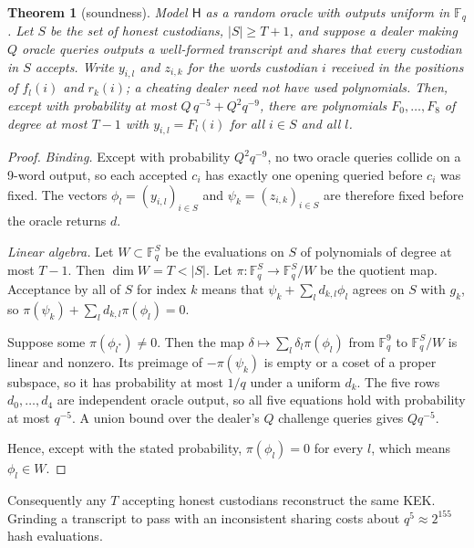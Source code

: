 \documentclass[10pt,a4paper]{article}
\newcommand{\Fq}{\mathbb{F}_q}
\newcommand{\Hash}{\mathsf{H}}
\newcommand{\abs}[1]{\left\lvert #1 \right\rvert}
\newtheorem{theorem}{Theorem}
\theoremstyle{definition}
\theoremstyle{remark}
\begin{document}
\begin{theorem}[soundness]\label{thm:sound}
Model $\Hash$ as a random oracle with outputs uniform in $\Fq$. Let $S$ be the set of honest custodians, $\abs{S} \ge T+1$, and suppose a dealer making $Q$ oracle queries outputs a well-formed transcript and shares that every custodian in $S$ accepts. Write $y_{i,l}$ and $z_{i,k}$ for the words custodian $i$ received in the positions of $f_l(i)$ and $r_k(i)$; a cheating dealer need not have used polynomials. Then, except with probability at most $Q\,q^{-5} + Q^2 q^{-9}$, there are polynomials $F_0,\dots,F_8$ of degree at most $T-1$ with $y_{i,l} = F_l(i)$ for all $i \in S$ and all $l$.
\end{theorem}
\begin{proof}
\emph{Binding.} Except with probability $Q^2 q^{-9}$, no two oracle queries collide on a 9-word output, so each accepted $c_i$ has exactly one opening queried before $c_i$ was fixed. The vectors $\phi_l = (y_{i,l})_{i\in S}$ and $\psi_k = (z_{i,k})_{i\in S}$ are therefore fixed before the oracle returns $d$.

\emph{Linear algebra.} Let $W \subset \Fq^{S}$ be the evaluations on $S$ of polynomials of degree at most $T-1$. Then $\dim W = T < \abs{S}$. Let $\pi: \Fq^S \to \Fq^S/W$ be the quotient map. Acceptance by all of $S$ for index $k$ means that $\psi_k + \sum_l d_{k,l}\phi_l$ agrees on $S$ with $g_k$, so $\pi(\psi_k) + \sum_l d_{k,l}\pi(\phi_l) = 0$.

Suppose some $\pi(\phi_{l^*}) \ne 0$. Then the map $\delta \mapsto \sum_l \delta_l \pi(\phi_l)$ from $\Fq^9$ to $\Fq^S/W$ is linear and nonzero. Its preimage of $-\pi(\psi_k)$ is empty or a coset of a proper subspace, so it has probability at most $1/q$ under a uniform $d_k$. The five rows $d_0,\dots,d_4$ are independent oracle output, so all five equations hold with probability at most $q^{-5}$. A union bound over the dealer's $Q$ challenge queries gives $Q q^{-5}$.

Hence, except with the stated probability, $\pi(\phi_l) = 0$ for every $l$, which means $\phi_l \in W$.
\end{proof}

Consequently any $T$ accepting honest custodians reconstruct the same KEK. Grinding a transcript to pass with an inconsistent sharing costs about $q^5 \approx 2^{155}$ hash evaluations.
\end{document}
